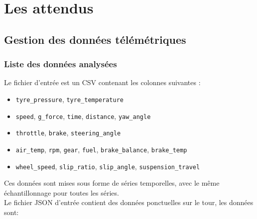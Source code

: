 \documentclass[a4paper,12pt]{report}
\begin{document}
\section{Les attendus}

\subsection{Gestion des données télémétriques}

\subsubsection{Liste des données analysées}

Le fichier d'entrée est un CSV contenant les colonnes suivantes :
\begin{itemize}
    \item \texttt{tyre\_pressure}, \texttt{tyre\_temperature}
    \item \texttt{speed}, \texttt{g\_force}, \texttt{time}, \texttt{distance}, \texttt{yaw\_angle}
    \item \texttt{throttle}, \texttt{brake}, \texttt{steering\_angle}
    \item \texttt{air\_temp}, \texttt{rpm}, \texttt{gear}, \texttt{fuel}, \texttt{brake\_balance}, \texttt{brake\_temp}
    \item \texttt{wheel\_speed}, \texttt{slip\_ratio}, \texttt{slip\_angle}, \texttt{suspension\_travel}
\end{itemize}

Ces données sont mises sous forme de séries temporelles, avec le même échantillonnage pour toutes les séries.\\


Le fichier JSON d'entrée contient des données ponctuelles sur le tour, les données sont:
\end{document}
